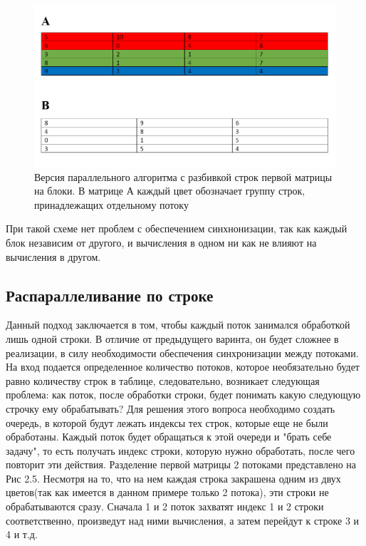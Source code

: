 \documentclass[12pt]{report}
\begin{document}
\begin{figure}[H]
	\centering
	\includegraphics[scale=0.5]{ex_1}
	\caption{Версия параллельного алгоритма с разбивкой строк первой матрицы на блоки. В матрице А каждый цвет обозначает группу строк, принадлежащих отдельному потоку}
	\label{fig:mpr}
\end{figure}

При такой схеме нет проблем с обеспечением синхнонизации, так как каждый блок независим от другого, и вычисления в одном ни как не влияют на вычисления в другом.

\subsection{Распараллеливание по строке}
\quad Данный подход заключается в том, чтобы каждый поток занимался обработкой лишь одной строки. В отличие от предыдущего варинта, он будет сложнее в реализации, в силу необходимости обеспечения синхронизации между потоками.
На вход подается определенное количество потоков, которое необязательно будет равно количеству строк в таблице, следовательно, возникает следующая проблема: как поток, после обработки строки, будет понимать какую следующую строчку ему обрабатывать? Для решения этого вопроса необходимо создать очередь, в которой будут лежать индексы тех строк, которые еще не были обработаны. Каждый поток будет обращаться к этой очереди и "брать себе задачу", то есть получать индекс строки, которую нужно обработать, после чего повторит эти действия. Разделение первой матрицы 2 потоками представлено на Рис 2.5. Несмотря на то, что на нем каждая строка закрашена одним из двух цветов(так как имеется в данном примере только 2 потока), эти строки не обрабатываются сразу. Сначала 1 и 2 поток захватят индекс 1 и 2 строки соответственно, произведут над ними вычисления, а затем перейдут к строке 3 и 4 и т.д.
\end{document}
